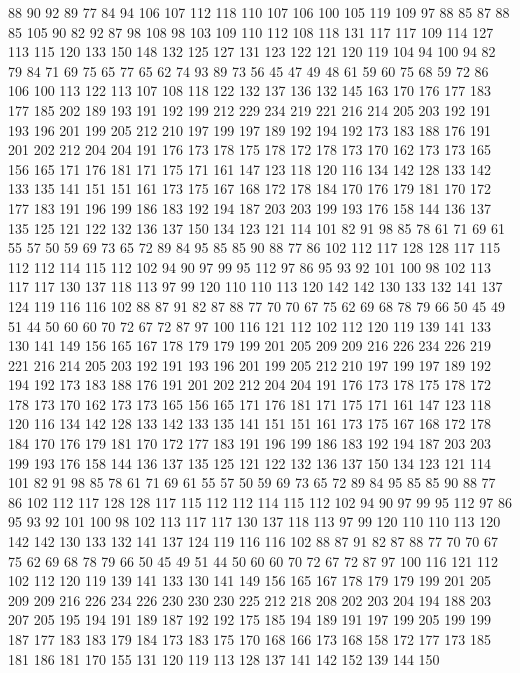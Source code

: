 88 90 92 89 77 84 94 106 107 112 118 110 107 106 100 105 119 109 97 88
85 87 88 85 105 90 82 92 87 98 108 98 103 109 110 112 108 118 131 117
117 109 114 127 113 115 120 133 150 148 132 125 127 131 123 122 121 120 119 104
94 100 94 82 79 84 71 69 75 65 77 65 62 74 93 89 73 56 45 47
49 48 61 59 60 75 68 59 72 86 106 100 113 122 113 107 108 118 122 132
137 136 132 145 163 170 176 177 183 177 185 202 189 193 191 192 199 212 229 234
219 221 216 214 205 203 192 191 193 196 201 199 205 212 210 197 199 197 189 192
194 192 173 183 188 176 191 201 202 212 204 204 191 176 173 178 175 178 172 178
173 170 162 173 173 165 156 165 171 176 181 171 175 171 161 147 123 118 120 116
134 142 128 133 142 133 135 141 151 151 161 173 175 167 168 172 178 184 170 176
179 181 170 172 177 183 191 196 199 186 183 192 194 187 203 203 199 193 176 158
144 136 137 135 125 121 122 132 136 137 150 134 123 121 114 101 82 91 98 85
78 61 71 69 61 55 57 50 59 69 73 65 72 89 84 95 85 85 90 88
77 86 102 112 117 128 128 117 115 112 112 114 115 112 102 94 90 97 99 95
112 97 86 95 93 92 101 100 98 102 113 117 117 130 137 118 113 97 99 120
110 110 113 120 142 142 130 133 132 141 137 124 119 116 116 102 88 87 91 82
87 88 77 70 70 67 75 62 69 68 78 79 66 50 45 49 51 44 50 60
60 70 72 67 72 87 97 100 116 121 112 102 112 120 119 139 141 133 130 141
149 156 165 167 178 179 179 199 201 205 209 209 216 226 234 226 219 221 216 214
205 203 192 191 193 196 201 199 205 212 210 197 199 197 189 192 194 192 173 183
188 176 191 201 202 212 204 204 191 176 173 178 175 178 172 178 173 170 162 173
173 165 156 165 171 176 181 171 175 171 161 147 123 118 120 116 134 142 128 133
142 133 135 141 151 151 161 173 175 167 168 172 178 184 170 176 179 181 170 172
177 183 191 196 199 186 183 192 194 187 203 203 199 193 176 158 144 136 137 135
125 121 122 132 136 137 150 134 123 121 114 101 82 91 98 85 78 61 71 69
61 55 57 50 59 69 73 65 72 89 84 95 85 85 90 88 77 86 102 112
117 128 128 117 115 112 112 114 115 112 102 94 90 97 99 95 112 97 86 95
93 92 101 100 98 102 113 117 117 130 137 118 113 97 99 120 110 110 113 120
142 142 130 133 132 141 137 124 119 116 116 102 88 87 91 82 87 88 77 70
70 67 75 62 69 68 78 79 66 50 45 49 51 44 50 60 60 70 72 67
72 87 97 100 116 121 112 102 112 120 119 139 141 133 130 141 149 156 165 167
178 179 179 199 201 205 209 209 216 226 234 226 230 230 230 225 212 218 208 202
203 204 194 188 203 207 205 195 194 191 189 187 192 192 175 185 194 189 191 197
199 205 199 199 187 177 183 183 179 184 173 183 175 170 168 166 173 168 158 172
177 173 185 181 186 181 170 155 131 120 119 113 128 137 141 142 152 139 144 150
